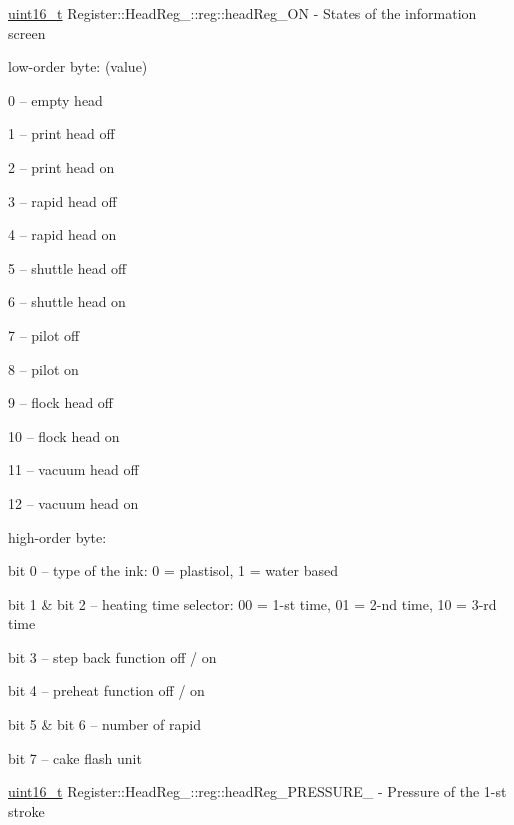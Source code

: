\mbox{\label{structRegister_1_1HeadReg___1_1reg_a6edf5f919d680bb61b5a84e41e67743b}} 
{\footnotesize\ttfamily \mbox{\hyperlink{settings_8h_a017dd44e68049ffdd31500a8cd01ba68}{uint16\+\_\+t}} Register\+::\+Head\+Reg\+\_\+\+::reg\+::\texorpdfstring{head\+Reg\+\_\+\+ON}{headReg\_ON}} - States of the information screen
\begin{DoxyCompactItemize}
\item low-order byte: (value)
\begin{DoxyCompactItemize}
\item 0 – empty head
\item 1 – print head off
\item 2 – print head on
\item 3 – rapid head off
\item 4 – rapid head on
\item 5 – shuttle head off
\item 6 – shuttle head on
\item 7 – pilot off
\item 8 – pilot on
\item 9 – flock head off
\item 10 – flock head on
\item 11 – vacuum head off
\item 12 – vacuum head on
\end{DoxyCompactItemize}
\item high-order byte:
\begin{DoxyCompactItemize}
\item bit 0 – type of the ink: 0 = plastisol, 1 = water based
\item bit 1 \& bit 2 – heating time selector: 00 = 1-st time,
01 = 2-nd time, 10 = 3-rd time
\item bit 3 – step back function off / on
\item bit 4 – preheat function off / on
\item bit 5 \& bit 6 – number of rapid
\item bit 7 – cake flash unit
\end{DoxyCompactItemize}
\end{DoxyCompactItemize}
\mbox{\label{structRegister_1_1HeadReg___1_1reg_a6ece244e182e6369c94fc5ba12237b4d}} 
{\footnotesize\ttfamily \mbox{\hyperlink{settings_8h_a017dd44e68049ffdd31500a8cd01ba68}{uint16\+\_\+t}} Register\+::\+Head\+Reg\+\_\+\+::reg\+::\texorpdfstring{head\+Reg\+\_\+\+P\+R\+E\+S\+S\+U\+R\+E\+\_}{headReg\_PRESSURE\_1}} - Pressure of the 1-st stroke

